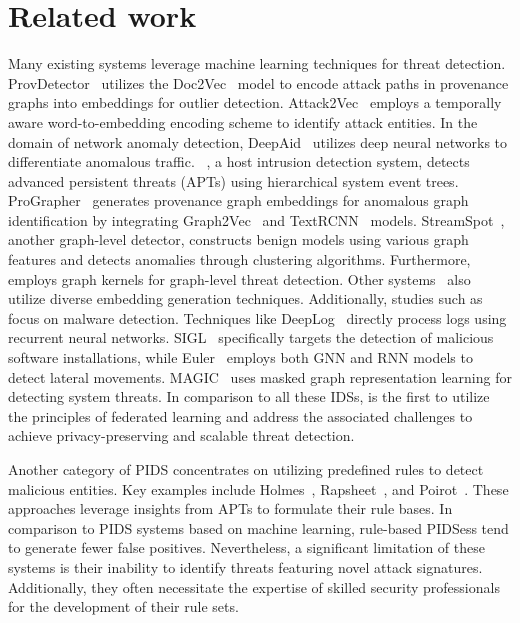 \section{Related work}
\label{s:relwk}



 Many existing systems leverage machine learning techniques for threat detection. ProvDetector~\cite{provdetector2020} utilizes the Doc2Vec~\cite{le2014distributed} model to encode attack paths in provenance graphs into embeddings for outlier detection. Attack2Vec~\cite{shen2019attack2vec} employs a temporally aware word-to-embedding encoding scheme to identify attack entities. In the domain of network anomaly detection, DeepAid~\cite{deepaid} utilizes deep neural networks to differentiate anomalous traffic. \disdet~\cite{dong2023distdet}, a host intrusion detection system, detects advanced persistent threats (APTs) using hierarchical system event trees. ProGrapher~\cite{yangprographer} generates provenance graph embeddings for anomalous graph identification by integrating Graph2Vec~\cite{narayanan2017graph2vec} and TextRCNN~\cite{lai2015recurrent} models. StreamSpot~\cite{streamspot}, another graph-level detector, constructs benign models using various graph features and detects anomalies through clustering algorithms. Furthermore, \unicorn~\cite{han2020unicorn} employs graph kernels for graph-level threat detection. Other systems~\cite{aljawarneh2018anomaly, maseer2021benchmarking, gyanchandani2012taxonomy,atlas} also utilize diverse embedding generation techniques. Additionally, studies such as \cite{zolkipli2011approach, chakkaravarthy2019survey, isohara2011kernel} focus on malware detection. Techniques like DeepLog~\cite{deeplog2017} directly process logs using recurrent neural networks. SIGL~\cite{sigl} specifically targets the detection of malicious software installations, while Euler~\cite{king2022euler} employs both GNN and RNN models to detect lateral movements. MAGIC~\cite{jia2023magic} uses masked graph representation learning for detecting system threats. In comparison to all these IDSs, \Sys is the first to utilize the principles of federated learning and address the associated challenges to achieve privacy-preserving and scalable threat detection.

 Another category of PIDS concentrates on utilizing predefined rules to detect malicious entities. Key examples include Holmes~\cite{holmes2019}, Rapsheet~\cite{rapsheet2020}, and Poirot~\cite{poirot2019}. These approaches leverage insights from APTs to formulate their rule bases. In comparison to PIDS systems based on machine learning, rule-based PIDSess tend to generate fewer false positives. Nevertheless, a significant limitation of these systems is their inability to identify threats featuring novel attack signatures. Additionally, they often necessitate the expertise of skilled security professionals for the development of their rule sets.

